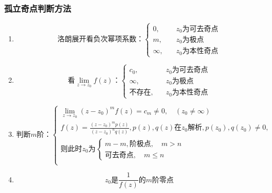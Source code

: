 \documentclass{article}
\begin{document}
\subsubsection{孤立奇点判断方法}

\begin{enumerate}
    \item 
    \begin{equation*}
        \text{洛朗展开看负次幂项系数：}
        \left\{
            \begin{aligned}
                0, &\quad z_0 \text{为可去奇点} \\
                m, &\quad z_0 \text{为极点} \\
                \infty, &\quad z_0 \text{为本性奇点}
            \end{aligned}
        \right.
    \end{equation*}
    \item 
    \begin{equation*}
        \text{看} \lim\limits_{z \to z_0} f(z) \text{：}
        \left\{
            \begin{aligned}
                c_0, &\quad z_0 \text{为可去奇点} \\
                \infty, &\quad z_0 \text{为极点} \\
                \text{不存在}, &\quad z_0 \text{为本性奇点}
            \end{aligned}
        \right.
    \end{equation*}
    \item 
    \begin{equation*}
        \text{判断} m \text{阶：}
        \left\{
            \begin{aligned}
                \lim\limits_{z \to z_0} (z-z_0)^m f(z) = c_m \neq 0, \quad (z_0 \neq \infty) \\
                f(z) = \frac{(z-z_0)^m p(z)}{(z-z_0)^n q(z)}, p(z),q(z) \text{在} z_0 \text{解析}, p(z_0),q(z_0) \neq 0, \\
                \text{则此时} z_0 \text{为} 
                \left\{
                    \begin{aligned}
                        m-m, \text{阶极点}, \quad m>n \\
                        \text{可去奇点}, \quad m \leq n
                    \end{aligned}
                \right. \\
            \end{aligned}
        \right.
    \end{equation*}
    \item 
    \begin{equation*}
        z_0\text{是} \frac{1}{f(z)} \text{的} m \text{阶零点} 
    \end{equation*}
\end{enumerate}
\end{document}
